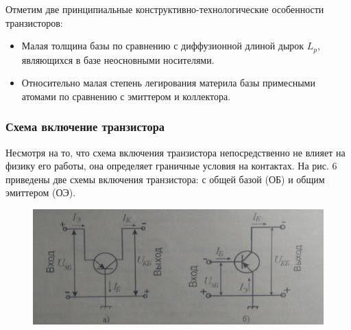 Отметим две принципиальные конструктивно-технологические особенности транзисторов:
\begin{itemize}
    \item Малая толщина базы по сравнению с диффузионной длиной дырок $L_p$, являющихся в базе неосновными носителями.
    \item   Относительно малая степень легирования материла базы примесными атомами по сравнению с эмиттером и коллектора.
\end{itemize}


\subsubsection{Схема включение транзистора}%
Несмотря на то, что схема включения транзистора непосредственно не влияет на физику его работы, она определяет граничные условия на контактах.
На рис. 6 приведены две схемы включения транзистора: с общей базой (ОБ) и общим эмиттером (ОЭ).

\begin{figure}[h]
    \centering
    \includegraphics[width=\linewidth]{fig/2.jpg}
    \caption{}
    \label{fig:}
\end{figure}
